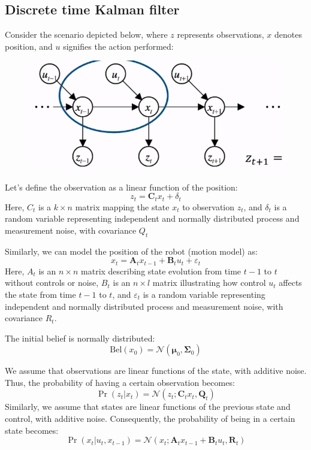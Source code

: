 \subsection{Discrete time Kalman filter}
Consider the scenario depicted below, where $z$ represents observations, $x$ denotes position, and $u$ signifies the action performed:
\begin{figure}[H]
    \centering
    \includegraphics[width=0.75\linewidth]{images/kal.png}
\end{figure}
Let's define the observation as a linear function of the position:
\[z_t=\mathbf{C}_tx_t+\delta_t\]
Here, $C_t$ is a $k\times n$ matrix mapping the state $x_t$ to observation $z_t$, and $\delta_t$ is a random variable representing independent and normally distributed process and measurement noise, with covariance $Q_t$

Similarly, we can model the position of the robot (motion model) as:
\[x_t=\mathbf{A}_tx_{t-1}+\mathbf{B}_tu_t+\varepsilon_t\]
Here, $A_t$ is an $n\times n$ matrix describing state evolution from time $t-1$ to $t$ without controls or noise, $B_t$ is an $n\times l$ matrix illustrating how control $u_t$ affects the state from time $t-1$ to $t$, and $\varepsilon_t$ is a random variable representing independent and normally distributed process and measurement noise, with covariance $R_t$. 

The initial belief is normally distributed:
\[\text{Bel}(x_0)=\mathcal{N}(\boldsymbol{\mu}_0,\mathbf{\Sigma}_0)\]

We assume that observations are linear functions of the state, with additive noise. 
Thus, the probability of having a certain observation becomes:
\[\Pr(z_t|x_t)=\mathcal{N}(z_t;\mathbf{C}_tx_t,\mathbf{Q}_t)\]
Similarly, we assume that states are linear functions of the previous state and control, with additive noise. 
Consequently, the probability of being in a certain state becomes:
\[\Pr(x_t|u_t,x_{t-1})=\mathcal{N}(x_t;\mathbf{A}_tx_{t-1}+\mathbf{B}_tu_t,\mathbf{R}_t)\]

